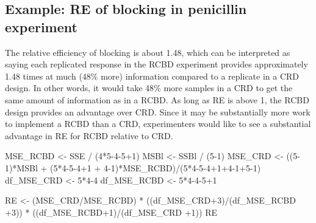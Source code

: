 \documentclass[
]{book}
\newenvironment{Shaded}{\begin{snugshade}}{\end{snugshade}}
\newcommand{\DecValTok}[1]{\textcolor[rgb]{0.00,0.00,0.81}{#1}}
\newcommand{\NormalTok}[1]{#1}
\newcommand{\OtherTok}[1]{\textcolor[rgb]{0.56,0.35,0.01}{#1}}
\newcommand{\SpecialCharTok}[1]{\textcolor[rgb]{0.00,0.00,0.00}{#1}}
\begin{document}
\hypertarget{example-re-of-blocking-in-penicillin-experiment}{%
\subsection{Example: RE of blocking in penicillin experiment}\label{example-re-of-blocking-in-penicillin-experiment}}

The relative efficiency of blocking is about 1.48, which can be interpreted as saying each replicated response in the RCBD experiment provides approximately 1.48 times at much (\(48\%\) more) information compared to a replicate in a CRD design. In other words, it would take \(48\%\) more samples in a CRD to get the same amount of information as in a RCBD. As long as RE is above 1, the RCBD design provides an advantage over CRD. Since it may be substantially more work to implement a RCBD than a CRD, experimenters would like to see a substantial advantage in RE for RCBD relative to CRD.

\begin{Shaded}
\begin{Highlighting}[]
\NormalTok{MSE\_RCBD }\OtherTok{\textless{}{-}}\NormalTok{ SSE }\SpecialCharTok{/}\NormalTok{ (}\DecValTok{4}\SpecialCharTok{*}\DecValTok{5{-}4{-}5}\SpecialCharTok{+}\DecValTok{1}\NormalTok{)}
\NormalTok{MSBl }\OtherTok{\textless{}{-}}\NormalTok{ SSBl }\SpecialCharTok{/}\NormalTok{ (}\DecValTok{5{-}1}\NormalTok{)}
\NormalTok{MSE\_CRD }\OtherTok{\textless{}{-}}\NormalTok{ ((}\DecValTok{5{-}1}\NormalTok{)}\SpecialCharTok{*}\NormalTok{MSBl }\SpecialCharTok{+}\NormalTok{ (}\DecValTok{5}\SpecialCharTok{*}\DecValTok{4{-}5{-}4}\SpecialCharTok{+}\DecValTok{1} \SpecialCharTok{+} \DecValTok{4{-}1}\NormalTok{)}\SpecialCharTok{*}\NormalTok{MSE\_RCBD)}\SpecialCharTok{/}\NormalTok{(}\DecValTok{5}\SpecialCharTok{*}\DecValTok{4{-}5{-}4}\SpecialCharTok{+}\DecValTok{1}\SpecialCharTok{+}\DecValTok{4{-}1}\SpecialCharTok{+}\DecValTok{5{-}1}\NormalTok{)}
\NormalTok{df\_MSE\_CRD }\OtherTok{\textless{}{-}} \DecValTok{5}\SpecialCharTok{*}\DecValTok{4{-}4}
\NormalTok{df\_MSE\_RCBD }\OtherTok{\textless{}{-}} \DecValTok{5}\SpecialCharTok{*}\DecValTok{4{-}4{-}5}\SpecialCharTok{+}\DecValTok{1}

\NormalTok{RE }\OtherTok{\textless{}{-}}\NormalTok{ (MSE\_CRD}\SpecialCharTok{/}\NormalTok{MSE\_RCBD) }\SpecialCharTok{*}\NormalTok{ ((df\_MSE\_CRD}\SpecialCharTok{+}\DecValTok{3}\NormalTok{)}\SpecialCharTok{/}\NormalTok{(df\_MSE\_RCBD }\SpecialCharTok{+}\DecValTok{3}\NormalTok{)) }\SpecialCharTok{*}\NormalTok{ ((df\_MSE\_RCBD}\SpecialCharTok{+}\DecValTok{1}\NormalTok{)}\SpecialCharTok{/}\NormalTok{(df\_MSE\_CRD }\SpecialCharTok{+}\DecValTok{1}\NormalTok{))}
\NormalTok{RE}
\end{Highlighting}
\end{Shaded}
\end{document}
